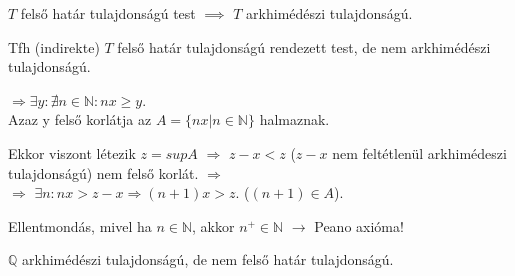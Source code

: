\begin{frame}
  \begin{tcolorbox}[title={Tétel: Felső határ és arkhimédészi tulajdonság}]
    $T$ felső határ tulajdonságú test $\implies$ $T$ arkhimédészi tulajdonságú.
  \tcblower
    \\
    \mmedskip
    
    Tfh (indirekte) $T$ felső határ tulajdonságú rendezett test, de nem arkhimédészi tulajdonságú.\\
    \msmallskip
    
    $\Rightarrow {\exists}y : {\nexists}n \in \mathbb{N} : nx \geq y$.\\
    Azaz y felső korlátja az $A = \{ nx | n \in \mathbb{N} \}$ halmaznak.\\
    \msmallskip

    Ekkor viszont létezik $z = sup A$ $\Rightarrow$ $z - x < z$ ($z - x$ nem feltétlenül arkhimédeszi tulajdonságú) nem felső korlát. $\Rightarrow$\\
    $\Rightarrow$ ${\exists}n : nx > z - x \Rightarrow (n + 1)x > z$. ($(n + 1) \in A$).\\
    \msmallskip
    
    Ellentmondás, mivel ha $n \in \mathbb{N}$, akkor $n^+ \in \mathbb{N}$ $\rightarrow$ Peano axióma!
  \end{tcolorbox}
\end{frame}

\begin{frame}
\begin{tcolorbox}[title={Tétel: Q nem felső határ tulajdonságú}]
$\mathbb{Q}$ arkhimédészi tulajdonságú, de nem felső határ tulajdonságú.
\end{tcolorbox}
\end{frame}



